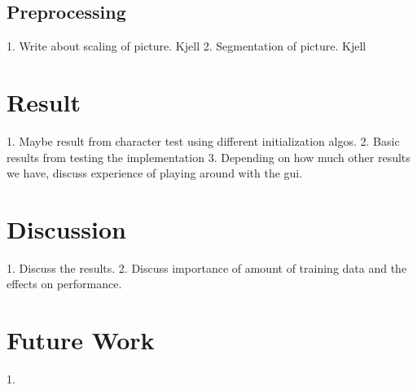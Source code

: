 \documentclass[11pt]{article}
\begin{document}
\subsection{Preprocessing}
1. Write about scaling of picture. Kjell
2. Segmentation of picture. Kjell

\section{Result}\label{sec:result}
1. Maybe result from character test using different initialization algos.
2. Basic results from testing the implementation
3. Depending on how much other results we have, discuss experience of playing around with the gui.

\section{Discussion}
1. Discuss the results.
2. Discuss importance of amount of training data and the effects on performance.

\section{Future Work}
1. 

\end{document}
